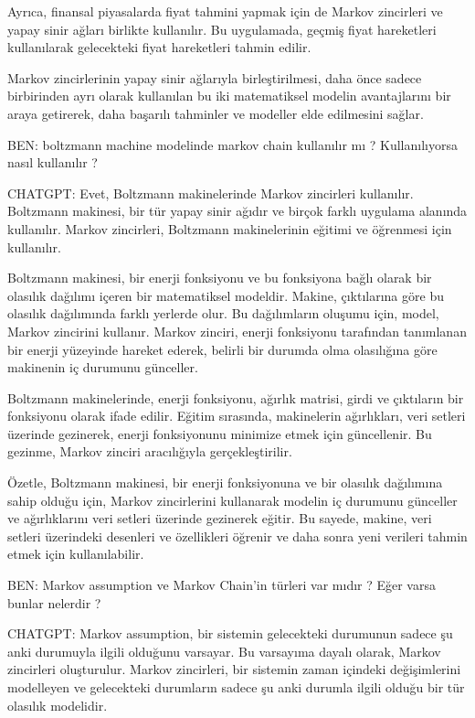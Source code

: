 \documentclass[11pt]{article}
\begin{document}
Ayrıca, finansal piyasalarda fiyat tahmini yapmak için de Markov zincirleri ve yapay sinir ağları birlikte kullanılır. Bu uygulamada, geçmiş fiyat hareketleri kullanılarak gelecekteki fiyat hareketleri tahmin edilir.

Markov zincirlerinin yapay sinir ağlarıyla birleştirilmesi, daha önce sadece birbirinden ayrı olarak kullanılan bu iki matematiksel modelin avantajlarını bir araya getirerek, daha başarılı tahminler ve modeller elde edilmesini sağlar.

BEN: boltzmann machine modelinde markov chain kullanılır mı ? Kullanılıyorsa nasıl kullanılır ?

CHATGPT: Evet, Boltzmann makinelerinde Markov zincirleri kullanılır. Boltzmann makinesi, bir tür yapay sinir ağıdır ve birçok farklı uygulama alanında kullanılır. Markov zincirleri, Boltzmann makinelerinin eğitimi ve öğrenmesi için kullanılır.

Boltzmann makinesi, bir enerji fonksiyonu ve bu fonksiyona bağlı olarak bir olasılık dağılımı içeren bir matematiksel modeldir. Makine, çıktılarına göre bu olasılık dağılımında farklı yerlerde olur. Bu dağılımların oluşumu için, model, Markov zincirini kullanır. Markov zinciri, enerji fonksiyonu tarafından tanımlanan bir enerji yüzeyinde hareket ederek, belirli bir durumda olma olasılığına göre makinenin iç durumunu günceller.

Boltzmann makinelerinde, enerji fonksiyonu, ağırlık matrisi, girdi ve çıktıların bir fonksiyonu olarak ifade edilir. Eğitim sırasında, makinelerin ağırlıkları, veri setleri üzerinde gezinerek, enerji fonksiyonunu minimize etmek için güncellenir. Bu gezinme, Markov zinciri aracılığıyla gerçekleştirilir.

Özetle, Boltzmann makinesi, bir enerji fonksiyonuna ve bir olasılık dağılımına sahip olduğu için, Markov zincirlerini kullanarak modelin iç durumunu günceller ve ağırlıklarını veri setleri üzerinde gezinerek eğitir. Bu sayede, makine, veri setleri üzerindeki desenleri ve özellikleri öğrenir ve daha sonra yeni verileri tahmin etmek için kullanılabilir.

BEN: Markov assumption ve Markov Chain'in türleri var mıdır ? Eğer varsa bunlar nelerdir ?

CHATGPT: Markov assumption, bir sistemin gelecekteki durumunun sadece şu anki durumuyla ilgili olduğunu varsayar. Bu varsayıma dayalı olarak, Markov zincirleri oluşturulur. Markov zincirleri, bir sistemin zaman içindeki değişimlerini modelleyen ve gelecekteki durumların sadece şu anki durumla ilgili olduğu bir tür olasılık modelidir.
\end{document}
